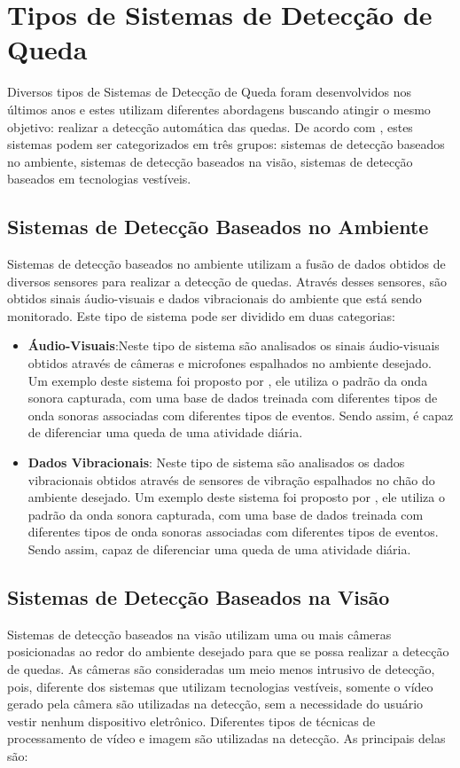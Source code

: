 \section{Tipos de Sistemas de Detecção de Queda}
\label{sec:fds_types}
Diversos tipos de Sistemas de Detecção de Queda foram desenvolvidos nos últimos anos e estes utilizam diferentes abordagens buscando atingir o mesmo objetivo: realizar a detecção automática das quedas. De acordo com \cite{mubashir2013survey}, estes sistemas podem ser categorizados em três grupos: sistemas de detecção baseados no ambiente, sistemas de detecção baseados na visão, sistemas de detecção baseados em tecnologias vestíveis.

\subsection{Sistemas de Detecção Baseados no Ambiente}
Sistemas de detecção baseados no ambiente utilizam a fusão de dados obtidos de diversos sensores para realizar a detecção de quedas. Através desses sensores, são obtidos sinais áudio-visuais e dados vibracionais do ambiente que está sendo monitorado. Este tipo de sistema pode ser dividido em duas categorias:

\begin{itemize}
	\item{\textbf{Áudio-Visuais}:Neste tipo de sistema são analisados os sinais áudio-visuais obtidos através de câmeras e microfones espalhados no ambiente desejado. Um exemplo deste sistema foi proposto por \cite{zhuang2009acoustic}, ele utiliza o padrão da onda sonora capturada, com uma base de dados treinada  com diferentes tipos de onda sonoras associadas com diferentes tipos de eventos. Sendo assim, é capaz de diferenciar uma queda de uma atividade diária. }
	
	\item{\textbf{Dados Vibracionais}: Neste tipo de sistema são analisados os dados vibracionais obtidos através de sensores de vibração espalhados no chão do ambiente desejado. Um exemplo deste sistema foi proposto por \cite{alwan2006smart}, ele utiliza o padrão da onda sonora capturada, com uma base de dados treinada  com diferentes tipos de onda sonoras associadas com diferentes tipos de eventos. Sendo assim, capaz de diferenciar uma queda de uma atividade diária. }
\end{itemize}



\subsection{Sistemas de Detecção Baseados na Visão}
Sistemas de detecção baseados na visão utilizam uma ou mais câmeras posicionadas ao redor do ambiente desejado para  que se possa realizar a detecção de quedas.  As câmeras são consideradas um meio menos intrusivo de detecção, pois, diferente dos sistemas que utilizam tecnologias vestíveis, somente o vídeo gerado pela câmera são utilizadas na detecção, sem a necessidade do usuário vestir nenhum dispositivo eletrônico. Diferentes tipos de técnicas de processamento de vídeo e imagem são utilizadas na detecção. As principais delas são:  

